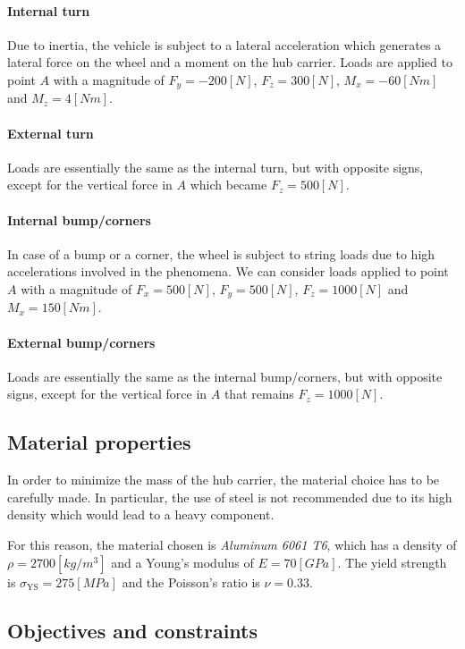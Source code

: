 \paragraph{Internal turn}
Due to inertia, the vehicle is subject to a lateral acceleration which generates a lateral force on the wheel and a moment on the hub carrier.
Loads are applied to point $A$ with a magnitude of $F_y = -200 [N]$, $F_z = 300 [N]$, $M_x = -60 [Nm]$ and $M_z = 4 [Nm]$.

\paragraph{External turn}
Loads are essentially the same as the internal turn, but with opposite signs, except for the vertical force in $A$ which became $F_z = 500 [N]$.

\paragraph{Internal bump/corners}
In case of a bump or a corner, the wheel is subject to string loads due to high accelerations involved in the phenomena.
We can consider loads applied to point $A$ with a magnitude of $F_x = 500 [N]$, $F_y = 500 [N]$, $F_z = 1000 [N]$ and $M_x = 150 [Nm]$.

\paragraph{External bump/corners}
Loads are essentially the same as the internal bump/corners, but with opposite signs, except for the vertical force in $A$ that remains $F_z = 1000 [N]$.


\subsection{Material properties}
\label{subsec:material_properties}

In order to minimize the mass of the hub carrier, the material choice has to be carefully made.
In particular, the use of steel is not recommended due to its high density which would lead to a heavy component.

For this reason, the material chosen is \textit{Aluminum 6061 T6}, which has a density of $\rho = 2700 [kg/m^3]$ and a Young's modulus of $E = 70 [GPa]$.
The yield strength is $\sigma_{\text{YS}} = 275 [MPa]$ and the Poisson's ratio is $\nu = 0.33$.


\subsection{Objectives and constraints}
\label{subsec:objectives_constraints}

